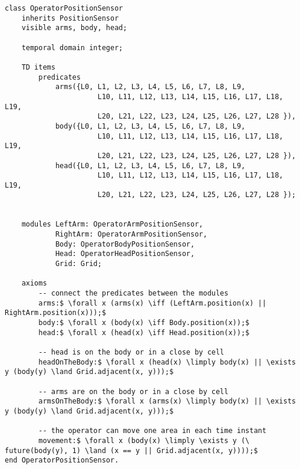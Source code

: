 \begin{lstlisting}[fontadjust, mathescape, frame=single] 
class OperatorPositionSensor
    inherits PositionSensor
    visible arms, body, head;

    temporal domain integer;

    TD items
        predicates
            arms({L0, L1, L2, L3, L4, L5, L6, L7, L8, L9,
                      L10, L11, L12, L13, L14, L15, L16, L17, L18, L19,
                      L20, L21, L22, L23, L24, L25, L26, L27, L28 }),
            body({L0, L1, L2, L3, L4, L5, L6, L7, L8, L9,
                      L10, L11, L12, L13, L14, L15, L16, L17, L18, L19,
                      L20, L21, L22, L23, L24, L25, L26, L27, L28 }),
            head({L0, L1, L2, L3, L4, L5, L6, L7, L8, L9,
                      L10, L11, L12, L13, L14, L15, L16, L17, L18, L19,
                      L20, L21, L22, L23, L24, L25, L26, L27, L28 });


    modules LeftArm: OperatorArmPositionSensor,
            RightArm: OperatorArmPositionSensor,
            Body: OperatorBodyPositionSensor,
            Head: OperatorHeadPositionSensor,
            Grid: Grid;

    axioms
        -- connect the predicates between the modules
        arms:$ \forall x (arms(x) \iff (LeftArm.position(x) || RightArm.position(x)));$
        body:$ \forall x (body(x) \iff Body.position(x));$
        head:$ \forall x (head(x) \iff Head.position(x));$

        -- head is on the body or in a close by cell
        headOnTheBody:$ \forall x (head(x) \limply body(x) || \exists y (body(y) \land Grid.adjacent(x, y)));$

        -- arms are on the body or in a close by cell
        armsOnTheBody:$ \forall x (arms(x) \limply body(x) || \exists y (body(y) \land Grid.adjacent(x, y)));$

        -- the operator can move one area in each time instant
        movement:$ \forall x (body(x) \limply \exists y (\  future(body(y), 1) \land (x == y || Grid.adjacent(x, y))));$
end OperatorPositionSensor.\end{lstlisting}